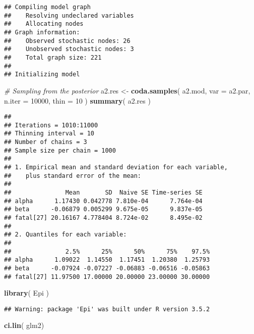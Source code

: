 \documentclass[]{article}
\newenvironment{Shaded}{\begin{snugshade}}{\end{snugshade}}
\newcommand{\KeywordTok}[1]{\textcolor[rgb]{0.13,0.29,0.53}{\textbf{#1}}}
\newcommand{\DataTypeTok}[1]{\textcolor[rgb]{0.13,0.29,0.53}{#1}}
\newcommand{\DecValTok}[1]{\textcolor[rgb]{0.00,0.00,0.81}{#1}}
\newcommand{\StringTok}[1]{\textcolor[rgb]{0.31,0.60,0.02}{#1}}
\newcommand{\CommentTok}[1]{\textcolor[rgb]{0.56,0.35,0.01}{\textit{#1}}}
\newcommand{\NormalTok}[1]{#1}
\begin{document}
\begin{verbatim}
## Compiling model graph
##    Resolving undeclared variables
##    Allocating nodes
## Graph information:
##    Observed stochastic nodes: 26
##    Unobserved stochastic nodes: 3
##    Total graph size: 221
## 
## Initializing model
\end{verbatim}

\begin{Shaded}
\begin{Highlighting}[]
 \CommentTok{# Sampling from the posterior}
\NormalTok{ a2.res <-}\StringTok{ }\KeywordTok{coda.samples}\NormalTok{( a2.mod,}
 \DataTypeTok{var =}\NormalTok{ a2.par,}
 \DataTypeTok{n.iter =} \DecValTok{10000}\NormalTok{,}
 \DataTypeTok{thin =} \DecValTok{10}\NormalTok{ )}
 \KeywordTok{summary}\NormalTok{( a2.res )}
\end{Highlighting}
\end{Shaded}

\begin{verbatim}
## 
## Iterations = 1010:11000
## Thinning interval = 10 
## Number of chains = 3 
## Sample size per chain = 1000 
## 
## 1. Empirical mean and standard deviation for each variable,
##    plus standard error of the mean:
## 
##               Mean       SD  Naive SE Time-series SE
## alpha      1.17430 0.042778 7.810e-04      7.764e-04
## beta      -0.06879 0.005299 9.675e-05      9.837e-05
## fatal[27] 20.16167 4.778404 8.724e-02      8.495e-02
## 
## 2. Quantiles for each variable:
## 
##               2.5%      25%      50%      75%    97.5%
## alpha      1.09022  1.14550  1.17451  1.20380  1.25793
## beta      -0.07924 -0.07227 -0.06883 -0.06516 -0.05863
## fatal[27] 11.97500 17.00000 20.00000 23.00000 30.00000
\end{verbatim}

\begin{Shaded}
\begin{Highlighting}[]
\KeywordTok{library}\NormalTok{( Epi )}
\end{Highlighting}
\end{Shaded}

\begin{verbatim}
## Warning: package 'Epi' was built under R version 3.5.2
\end{verbatim}

\begin{Shaded}
\begin{Highlighting}[]
\KeywordTok{ci.lin}\NormalTok{( glm2)}
\end{Highlighting}
\end{Shaded}
\end{document}
